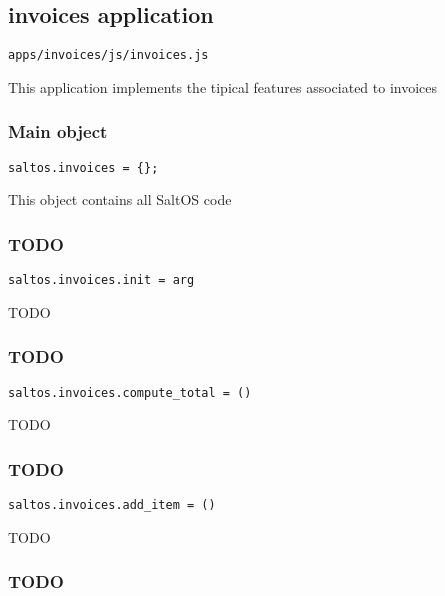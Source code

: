 \documentclass[a4paper]{article}
\begin{document}
\hypertarget{toc140}{}
\subsection{invoices application}

\begin{lstlisting}
apps/invoices/js/invoices.js
\end{lstlisting}

This application implements the tipical features associated to invoices

\hypertarget{toc141}{}
\subsubsection{Main object}

\begin{lstlisting}
saltos.invoices = {};
\end{lstlisting}

This object contains all SaltOS code

\hypertarget{toc142}{}
\subsubsection{TODO}

\begin{lstlisting}
saltos.invoices.init = arg
\end{lstlisting}

TODO

\hypertarget{toc143}{}
\subsubsection{TODO}

\begin{lstlisting}
saltos.invoices.compute_total = ()
\end{lstlisting}

TODO

\hypertarget{toc144}{}
\subsubsection{TODO}

\begin{lstlisting}
saltos.invoices.add_item = ()
\end{lstlisting}

TODO

\hypertarget{toc145}{}
\subsubsection{TODO}
\end{document}
